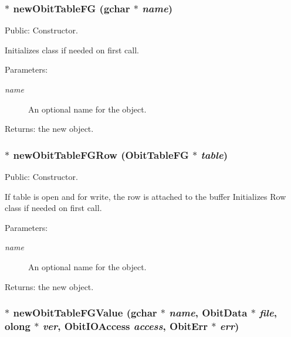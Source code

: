 \subsubsection{$\ast$ new\-Obit\-Table\-FG (gchar $\ast$ {\em name})}\label{ObitTableFG_8c_a16}


Public: Constructor. 

Initializes class if needed on first call. \begin{Desc}
\item[Parameters:]
\begin{description}
\item[{\em name}]An optional name for the object. \end{description}
\end{Desc}
\begin{Desc}
\item[Returns:]the new object. \end{Desc}
\subsubsection{$\ast$ new\-Obit\-Table\-FGRow ({\bf Obit\-Table\-FG} $\ast$ {\em table})}\label{ObitTableFG_8c_a14}


Public: Constructor. 

If table is open and for write, the row is attached to the buffer Initializes Row class if needed on first call. \begin{Desc}
\item[Parameters:]
\begin{description}
\item[{\em name}]An optional name for the object. \end{description}
\end{Desc}
\begin{Desc}
\item[Returns:]the new object. \end{Desc}
\subsubsection{$\ast$ new\-Obit\-Table\-FGValue (gchar $\ast$ {\em name}, {\bf Obit\-Data} $\ast$ {\em file}, {\bf olong} $\ast$ {\em ver}, Obit\-IOAccess {\em access}, {\bf Obit\-Err} $\ast$ {\em err})}\label{ObitTableFG_8c_a18}


